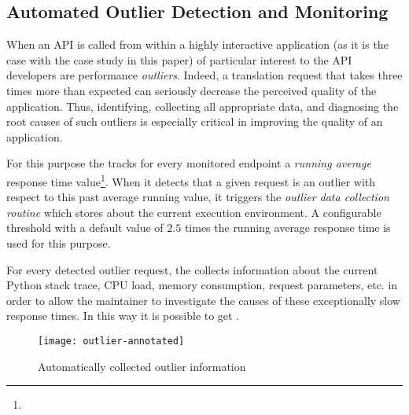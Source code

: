  \subsection{Automated Outlier Detection and Monitoring}
  
  When an API is called from within a highly interactive application (as it is the case with the case study in this paper) 
  of particular interest to the API developers are performance {\em outliers}.   Indeed, a translation request that takes three times more than expected can seriously decrease the perceived quality of the application. Thus, identifying, collecting all appropriate data, and diagnosing the root causes of such outliers is especially critical in improving the quality of an application. 
  
  
  For this purpose the \tool tracks for every monitored endpoint a {\em running average} response time value\footnote{}. When it detects that a given request is an outlier with respect to this past average running value, it triggers the {\em outlier data collection routine} which stores  about the current execution environment. A configurable threshold with a default value of $2.5$ times the running average response time is used for this purpose. 

  For every detected outlier request, the \tool collects information about the current Python stack trace, CPU load, memory consumption, request parameters, etc. in order to allow the maintainer to investigate the causes of these exceptionally slow response times. In this way it is possible to get .


  \begin{figure}[h!]
    \centering
    \texttt{[image: outlier-annotated]}
    \caption{Automatically collected outlier information}
    \label{fig:stack}
  \end{figure}
  

